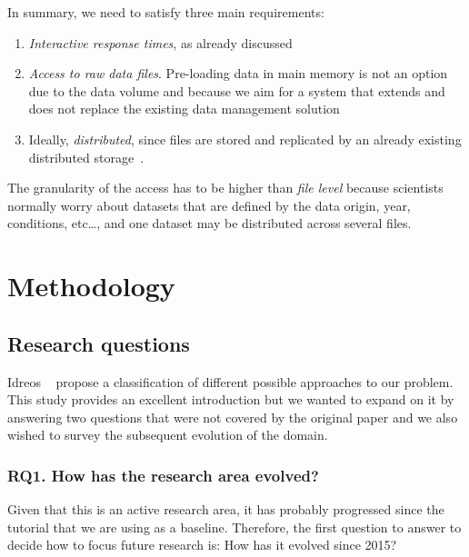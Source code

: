 
In summary, we need to satisfy three main requirements:

\begin{enumerate}
  \item \emph{Interactive response times}, as already discussed
  \item \emph{Access to raw data files}. Pre-loading data in main memory is not an
    option due to the data volume and because we aim for a system that extends and does
    not replace the existing data management solution
  \item Ideally, \emph{distributed}, since files are stored and replicated by an already existing
    distributed storage~\cite{Baud2012}.
\end{enumerate}

The granularity of the access has to be higher than \emph{file level} because
scientists normally worry about datasets that are defined by the data origin,
year, conditions, etc\ldots, and one dataset may be distributed across
several files.

\section{Methodology}
\label{sec:mapping/methodology}

\subsection{Research questions}
\label{sec:mapping/research_questions}

Idreos \etal~\cite{Idreos2015} propose a classification of different possible approaches
to our problem.
This study provides an excellent introduction but we wanted to expand on it by answering
two questions that were not covered by the original paper and we also wished to survey
the subsequent evolution of the domain.

\subsubsection{RQ1. How has the research area evolved?}
Given that this is an active research area, it has probably progressed since
the tutorial that we are using as a baseline. Therefore, the first
question to answer to decide how to focus future research is:
How has it evolved since 2015?

